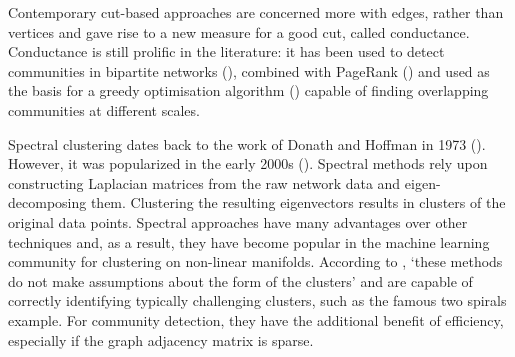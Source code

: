 \documentclass[
11pt, %
english, %
singlespacing, %
headsepline, %
]{MastersDoctoralThesis} %
\begin{document}
Contemporary cut-based approaches are concerned more with edges, rather than vertices and gave rise to a new measure for a good cut, called conductance.
Conductance is still prolific in the literature: it has been used to detect communities in bipartite networks (\cite{barber2007modularity}), combined with PageRank (\cite{andersen2006local}) and used as the basis for a greedy optimisation algorithm (\cite{lancichinetti2009community}) capable of finding overlapping communities at different scales. 

Spectral clustering dates back to the work of Donath and Hoffman in 1973 (\cite{donath1973lower}). 
However, it was popularized in the early 2000s (\cite{shi2000normalized,ng2002spectral,ding2004tutorial}). 
Spectral methods rely upon constructing Laplacian matrices from the raw network data and eigen-decomposing them. 
Clustering the resulting eigenvectors results in clusters of the original data points. 
Spectral approaches have many advantages over other techniques and, as a result, they have become popular in the machine learning community for clustering  on non-linear manifolds. 
According to \cite{von2007tutorial}, `these methods do not make assumptions about the form of the clusters' and are capable of correctly identifying typically challenging clusters, such as the famous two spirals example. 
For community detection, they have the additional benefit of efficiency, especially if the graph adjacency matrix is sparse. 
\end{document}
